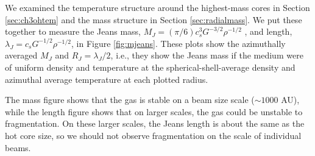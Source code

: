 \documentclass{emulateapj}
\begin{document}
We examined the temperature structure around the highest-mass cores in Section
\ref{sec:ch3ohtem} and the mass structure in Section \ref{sec:radialmass}.  We
put these together to measure the Jeans mass, $M_J = (\pi / 6) c_s^3
G^{-3/2} \rho^{-1/2}$
, and length, $\lambda_J = c_s G^{-1/2} \rho^{-1/2}$, 
in
Figure \ref{fig:mjeans}.  These plots show the azimuthally averaged $M_J$
and $R_J=\lambda_J/2$,
i.e., they show the Jeans mass if the medium
were of uniform density and temperature at the spherical-shell-average density
and azimuthal average temperature at each plotted radius.

The mass figure shows that the gas is stable on a beam size scale ($\sim1000$
AU), while the length figure shows that on larger scales, the gas could be
unstable to fragmentation.  On these larger scales, the Jeans length is about
the same as the hot core size, so we should not observe fragmentation on
the scale of individual beams.



\end{document}
